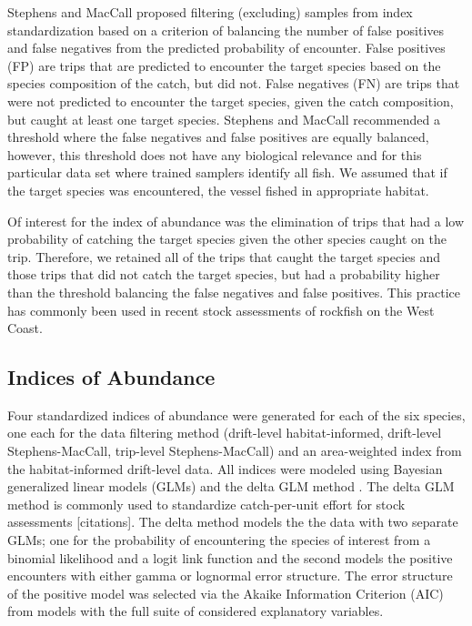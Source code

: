 \documentclass[
  12pt,
  authoryear,
  preprint,
  3p]{elsarticle}
\begin{document}
Stephens and MacCall proposed filtering (excluding) samples from index
standardization based on a criterion of balancing the number of false
positives and false negatives from the predicted probability of
encounter. False positives (FP) are trips that are predicted to
encounter the target species based on the species composition of the
catch, but did not. False negatives (FN) are trips that were not
predicted to encounter the target species, given the catch composition,
but caught at least one target species. Stephens and MacCall recommended
a threshold where the false negatives and false positives are equally
balanced, however, this threshold does not have any biological relevance
and for this particular data set where trained samplers identify all
fish. We assumed that if the target species was encountered, the vessel
fished in appropriate habitat.

Of interest for the index of abundance was the elimination of trips that
had a low probability of catching the target species given the other
species caught on the trip. Therefore, we retained all of the trips that
caught the target species and those trips that did not catch the target
species, but had a probability higher than the threshold balancing the
false negatives and false positives. This practice has commonly been
used in recent stock assessments of rockfish on the West Coast.

\hypertarget{indices-of-abundance}{%
\subsection{Indices of Abundance}\label{indices-of-abundance}}

Four standardized indices of abundance were generated for each of the
six species, one each for the data filtering method (drift-level
habitat-informed, drift-level Stephens-MacCall, trip-level
Stephens-MacCall) and an area-weighted index from the habitat-informed
drift-level data. All indices were modeled using Bayesian generalized
linear models (GLMs) and the delta GLM method
\citep{Lo:1992:IRA, Stefansson:1996:AGS}. The delta GLM method is
commonly used to standardize catch-per-unit effort for stock assessments
{[}citations{]}. The delta method models the the data with two separate
GLMs; one for the probability of encountering the species of interest
from a binomial likelihood and a logit link function and the second
models the positive encounters with either gamma or lognormal error
structure. The error structure of the positive model was selected via
the Akaike Information Criterion (AIC) from models with the full suite
of considered explanatory variables.
\end{document}
